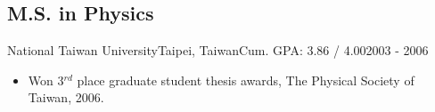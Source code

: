 \documentclass[11pt, letterpaper]{yt_resume}   	%
\begin{document}
\subsection{M.S. in Physics}{National Taiwan University}{Taipei, Taiwan}{Cum. GPA: 3.86 / 4.00}{2003 - 2006}
\begin{itemize}
\item Won 3$^{rd}$ place graduate student thesis awards, The Physical Society of Taiwan, 2006.
\end{itemize}
\end{document}
